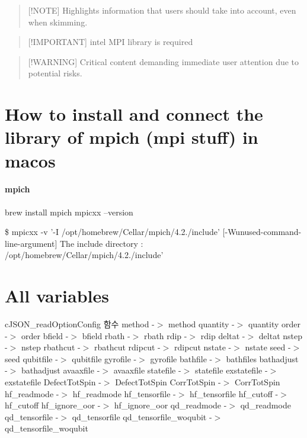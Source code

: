 \begin{quotation}
\mbox{[}!\-N\-O\-T\-E\mbox{]} Highlights information that users should take into account, even when skimming.

\end{quotation}


\begin{quotation}
\mbox{[}!\-I\-M\-P\-O\-R\-T\-A\-N\-T\mbox{]} intel M\-P\-I library is required

\end{quotation}


\begin{quotation}
\mbox{[}!\-W\-A\-R\-N\-I\-N\-G\mbox{]} Critical content demanding immediate user attention due to potential risks.

\end{quotation}


\section*{How to install and connect the library of mpich (mpi stuff) in macos}

\paragraph*{mpich}

brew install mpich mpicxx --version

\$ mpicxx -\/v '-\/\-I /opt/homebrew/\-Cellar/mpich/4.2./include' \mbox{[}-\/\-Wunused-\/command-\/line-\/argument\mbox{]} The include directory \-: /opt/homebrew/\-Cellar/mpich/4.2./include'

\section*{All variables}

c\-J\-S\-O\-N\-\_\-read\-Option\-Config 함수 method -\/$>$ method quantity -\/$>$ quantity order -\/$>$ order bfield -\/$>$ bfield rbath -\/$>$ rbath rdip -\/$>$ rdip deltat -\/$>$ deltat nstep -\/$>$ nstep rbathcut -\/$>$ rbathcut rdipcut -\/$>$ rdipcut nstate -\/$>$ nstate seed -\/$>$ seed qubitfile -\/$>$ qubitfile gyrofile -\/$>$ gyrofile bathfile -\/$>$ bathfiles bathadjust -\/$>$ bathadjust avaaxfile -\/$>$ avaaxfile statefile -\/$>$ statefile exstatefile -\/$>$ exstatefile Defect\-Tot\-Spin -\/$>$ Defect\-Tot\-Spin Corr\-Tot\-Spin -\/$>$ Corr\-Tot\-Spin hf\-\_\-readmode -\/$>$ hf\-\_\-readmode hf\-\_\-tensorfile -\/$>$ hf\-\_\-tensorfile hf\-\_\-cutoff -\/$>$ hf\-\_\-cutoff hf\-\_\-ignore\-\_\-oor -\/$>$ hf\-\_\-ignore\-\_\-oor qd\-\_\-readmode -\/$>$ qd\-\_\-readmode qd\-\_\-tensorfile -\/$>$ qd\-\_\-tensorfile qd\-\_\-tensorfile\-\_\-woqubit -\/$>$ qd\-\_\-tensorfile\-\_\-woqubit

